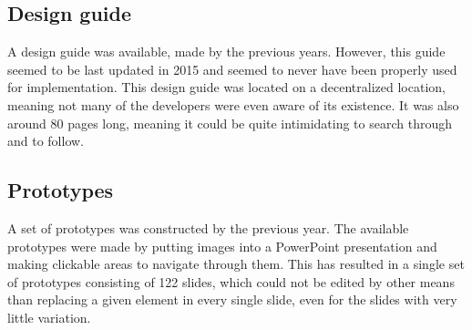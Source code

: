 \subsection{Design guide}
A design guide was available, made by the previous years.
However, this guide seemed to be last updated in 2015 and seemed to never have been properly used for implementation.
This design guide was located on a decentralized location, meaning not many of the developers were even aware of its existence.
It was also around 80 pages long, meaning it could be quite intimidating to search through and to follow.

\subsection{Prototypes}
A set of prototypes was constructed by the previous year.
The available prototypes were made by putting images into a PowerPoint presentation and making clickable areas to navigate through them.
This has resulted in a single set of prototypes consisting of 122 slides, which could not be edited by other means than replacing a given element in every single slide, even for the slides with very little variation.



